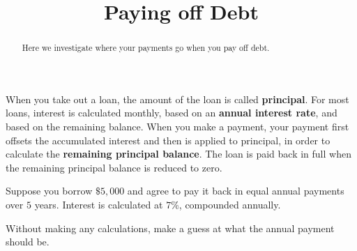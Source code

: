 \documentclass[handout,space,nooutcomes]{ximera}
\title{Paying off Debt}
\begin{document}
\begin{abstract}
Here we investigate where your payments go when you pay off debt.
\end{abstract}
\maketitle

When you take out a loan, the amount of the loan is called
\textbf{principal}.  For most loans, interest is calculated monthly,
based on an \textbf{annual interest rate}, and based on the remaining
balance.  When you make a payment, your payment first offsets the
accumulated interest and then is applied to principal, in order to
calculate the \textbf{remaining principal balance}.  The loan is paid
back in full when the remaining principal balance is reduced to zero.

\begin{question}[1in]
Suppose you borrow $\$5,000$ and agree to pay it back in equal annual
payments over $5$ years.  Interest is calculated at $7\%$,
compounded annually. 

Without making any calculations, make a guess at what the annual payment should be.  
\begin{freeResponse}
\end{freeResponse}
\end{question}
\end{document}
